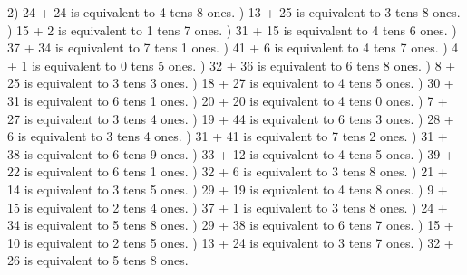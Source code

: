 \documentclass{article}%
\begin{document}
2) 24 + 24 is equivalent to 4 tens 8 ones.%
) 13 + 25 is equivalent to 3 tens 8 ones.%
) 15 + 2 is equivalent to 1 tens 7 ones.%
) 31 + 15 is equivalent to 4 tens 6 ones.%
) 37 + 34 is equivalent to 7 tens 1 ones.%
) 41 + 6 is equivalent to 4 tens 7 ones.%
) 4 + 1 is equivalent to 0 tens 5 ones.%
) 32 + 36 is equivalent to 6 tens 8 ones.%
) 8 + 25 is equivalent to 3 tens 3 ones.%
) 18 + 27 is equivalent to 4 tens 5 ones.%
) 30 + 31 is equivalent to 6 tens 1 ones.%
) 20 + 20 is equivalent to 4 tens 0 ones.%
) 7 + 27 is equivalent to 3 tens 4 ones.%
) 19 + 44 is equivalent to 6 tens 3 ones.%
) 28 + 6 is equivalent to 3 tens 4 ones.%
) 31 + 41 is equivalent to 7 tens 2 ones.%
) 31 + 38 is equivalent to 6 tens 9 ones.%
) 33 + 12 is equivalent to 4 tens 5 ones.%
) 39 + 22 is equivalent to 6 tens 1 ones.%
) 32 + 6 is equivalent to 3 tens 8 ones.%
) 21 + 14 is equivalent to 3 tens 5 ones.%
) 29 + 19 is equivalent to 4 tens 8 ones.%
) 9 + 15 is equivalent to 2 tens 4 ones.%
) 37 + 1 is equivalent to 3 tens 8 ones.%
) 24 + 34 is equivalent to 5 tens 8 ones.%
) 29 + 38 is equivalent to 6 tens 7 ones.%
) 15 + 10 is equivalent to 2 tens 5 ones.%
) 13 + 24 is equivalent to 3 tens 7 ones.%
) 32 + 26 is equivalent to 5 tens 8 ones.%
\newline%
\newpage%
\end{document}
